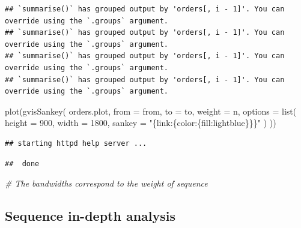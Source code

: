 \documentclass[
]{book}
\newenvironment{Shaded}{\begin{snugshade}}{\end{snugshade}}
\newcommand{\AttributeTok}[1]{\textcolor[rgb]{0.77,0.63,0.00}{#1}}
\newcommand{\CommentTok}[1]{\textcolor[rgb]{0.56,0.35,0.01}{\textit{#1}}}
\newcommand{\DecValTok}[1]{\textcolor[rgb]{0.00,0.00,0.81}{#1}}
\newcommand{\FunctionTok}[1]{\textcolor[rgb]{0.00,0.00,0.00}{#1}}
\newcommand{\NormalTok}[1]{#1}
\newcommand{\StringTok}[1]{\textcolor[rgb]{0.31,0.60,0.02}{#1}}
\begin{document}
\begin{verbatim}
## `summarise()` has grouped output by 'orders[, i - 1]'. You can override using the `.groups` argument.
## `summarise()` has grouped output by 'orders[, i - 1]'. You can override using the `.groups` argument.
## `summarise()` has grouped output by 'orders[, i - 1]'. You can override using the `.groups` argument.
## `summarise()` has grouped output by 'orders[, i - 1]'. You can override using the `.groups` argument.
\end{verbatim}

\begin{Shaded}
\begin{Highlighting}[]
\FunctionTok{plot}\NormalTok{(}\FunctionTok{gvisSankey}\NormalTok{(}
\NormalTok{    orders.plot,}
    \AttributeTok{from =} \StringTok{\textquotesingle{}from\textquotesingle{}}\NormalTok{,}
    \AttributeTok{to =} \StringTok{\textquotesingle{}to\textquotesingle{}}\NormalTok{,}
    \AttributeTok{weight =} \StringTok{\textquotesingle{}n\textquotesingle{}}\NormalTok{,}
    \AttributeTok{options =} \FunctionTok{list}\NormalTok{(}
        \AttributeTok{height =} \DecValTok{900}\NormalTok{,}
        \AttributeTok{width =} \DecValTok{1800}\NormalTok{,}
        \AttributeTok{sankey =} \StringTok{"\{link:\{color:\{fill:\textquotesingle{}lightblue\textquotesingle{}\}\}\}"}
\NormalTok{    )}
\NormalTok{))}
\end{Highlighting}
\end{Shaded}

\begin{verbatim}
## starting httpd help server ...
\end{verbatim}

\begin{verbatim}
##  done
\end{verbatim}

\begin{Shaded}
\begin{Highlighting}[]
\CommentTok{\# The bandwidths correspond to the weight of sequence}
\end{Highlighting}
\end{Shaded}

\hypertarget{sequence-in-depth-analysis}{%
\subsection{Sequence in-depth analysis}\label{sequence-in-depth-analysis}}
\end{document}
